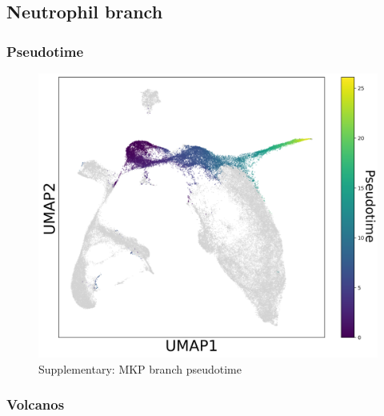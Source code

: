 \documentclass[a4paper]{article}
\begin{document}
\FloatBarrier
\subsection{Neutrophil branch}

\subsubsection{Pseudotime}
\begin{figure}[!htb]
  \centering
  \includegraphics[width=\textwidth]{../figures/hematopoiesis/Neutrophil_40_106_single_branch_pseudotime.png}
  \caption{Supplementary: MKP branch pseudotime}
\end{figure}

\FloatBarrier
\subsubsection{Volcanos}
\end{document}
